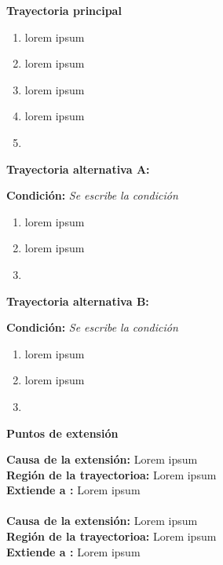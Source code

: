 

\begin{large}
	\textbf{Trayectoria principal}
\end{large}	

\begin{enumerate}[1.]
	\item \actor lorem ipsum
	\item \sistema lorem ipsum
	\item \sistema lorem ipsum
	\item \sistema lorem ipsum
	\item \finCU	
\end{enumerate}



\begin{large}
	\textbf{Trayectoria alternativa A:}\\
\end{large}	
\textbf{Condición:} \textit{Se escribe la condición}
\begin{enumerate}[{A-}1.]

	\item \actor lorem ipsum
	\item \sistema lorem ipsum
	\item \finTA	

\end{enumerate}


\begin{large}
	\textbf{Trayectoria alternativa B:}\\
\end{large}	
\textbf{Condición:} \textit{Se escribe la condición}

\begin{enumerate}[{B-}1.]

	\item \actor lorem ipsum
	\item \sistema lorem ipsum
	\item \finTA	

\end{enumerate}



\begin{large}
	\textbf{Puntos de extensión}\\
\end{large}	

\textbf{Causa de la extensión:} Lorem ipsum\\
\textbf{Región de la trayectorioa:} Lorem ipsum\\
\textbf{Extiende a :} Lorem ipsum\\\\

\textbf{Causa de la extensión:} Lorem ipsum\\
\textbf{Región de la trayectorioa:} Lorem ipsum\\
\textbf{Extiende a :} Lorem ipsum\\

